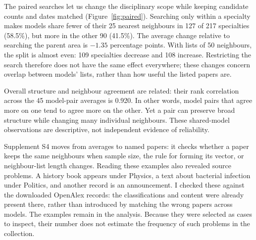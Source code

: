 \documentclass[12pt]{article}
\begin{document}
The paired searches let us change the disciplinary scope while keeping candidate counts and dates matched (Figure~\ref{fig:paired}). Searching only within a specialty makes models share fewer of their 25 nearest neighbours in 127 of 217 specialties (58.5\%), but more in the other 90 (41.5\%). The average change relative to searching the parent area is $-1.35$ percentage points. With lists of 50 neighbours, the split is almost even: 109 specialties decrease and 108 increase. Restricting the search therefore does not have the same effect everywhere; these changes concern overlap between models' lists, rather than how useful the listed papers are.

Overall structure and neighbour agreement are related: their rank correlation across the 45 model-pair averages is 0.920. In other words, model pairs that agree more on one tend to agree more on the other. Yet a pair can preserve broad structure while changing many individual neighbours. These shared-model observations are descriptive, not independent evidence of reliability.

Supplement S4 moves from averages to named papers: it checks whether a paper keeps the same neighbours when sample size, the rule for forming its vector, or neighbour-list length changes. Reading these examples also revealed source problems. A history book appears under Physics, a text about bacterial infection under Politics, and another record is an announcement. I checked these against the downloaded OpenAlex records: the classifications and content were already present there, rather than introduced by matching the wrong papers across models. The examples remain in the analysis. Because they were selected as cases to inspect, their number does not estimate the frequency of such problems in the collection.
\end{document}
